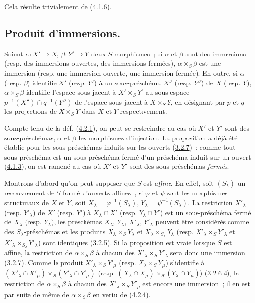 Cela résulte trivialement de (\hyperref[I.4.1.6-fr]{4.1.6}).

\subsection{Produit d'immersions.}
\label{subsection:I.4.3-fr}

\begin{proposition}[4.3.1]
\label{I.4.3.1-fr}
Soient $\alpha:X'\to X$, $\beta:Y'\to Y$ deux $S$-morphismes~; si $\alpha$ et
$\beta$ sont des immersions (resp. des immersions ouvertes, des immersions
fermées), $\alpha\times_S\beta$ est une immersion (resp. une immersion ouverte,
une immersion fermée). En outre, si $\alpha$ (resp. $\beta$) identifie $X'$
(resp. $Y'$) à un sous-préschéma $X''$ (resp. $Y''$) de $X$ (resp. $Y$),
$\alpha\times_S\beta$ identifie l'espace sous-jacent à $X'\times_S Y'$ au
sous-espace $p^{-1}(X'')\cap q^{-1}(Y'')$ de l'espace sous-jacent à
$X\times_S Y$, en désignant par $p$ et $q$ les projections de $X\times_S Y$
dans $X$ et $Y$ respectivement.
\end{proposition}

Compte tenu de la déf. (\hyperref[I.4.2.1-fr]{4.2.1}), on peut se restreindre
au cas où $X'$ et $Y'$ sont des sous-préschémas, $\alpha$ et $\beta$ les
morphismes d'injection. La proposition a déjà été établie pour les
sous-préschémas induits sur les ouverts (\hyperref[I.3.2.7-fr]{3.2.7})~; comme
tout sous-préschéma est un sous-préschéma fermé d'un préschéma induit sur un
ouvert (\hyperref[I.4.1.3-fr]{4.1.3}), on est ramené au cas où $X'$ et $Y'$ sont
des sous-préschémas \emph{fermés}.

Montrons d'abord qu'on peut supposer que $S$ est \emph{affine}. En effet, soit
$(S_\lambda)$ un recouvrement de $S$ formé d'ouverts affines~; si $\varphi$ et
$\psi$ sont les morphismes structuraux de $X$ et $Y$, soit
$X_\lambda=\varphi^{-1}(S_\lambda)$, $Y_\lambda=\psi^{-1}(S_\lambda)$. La
restriction $X'_\lambda$ (resp. $Y'_\lambda$) de $X'$ (resp. $Y'$) à
$X_\lambda\cap X'$ (resp. $Y_\lambda\cap Y'$) est un sous-préschéma fermé de
$X_\lambda$ (resp. $Y_\lambda$), les préschémas $X_\lambda$, $Y_\lambda$,
$X'_\lambda$, $Y'_\lambda$ peuvent être considérés comme des
$S_\lambda$-préschémas et les produits $X_\lambda\times_S Y_\lambda$ et
$X_\lambda\times_{S_\lambda}Y_\lambda$ (resp.
$X'_\lambda\times_S Y'_\lambda$ et
$X'_\lambda\times_{S_\lambda}Y'_\lambda$) sont identiques
(\hyperref[I.3.2.5-fr]{3.2.5}). Si la proposition est vraie lorsque $S$ est
affine, la restriction de $\alpha\times_S\beta$ à chacun des
$X'_\lambda\times_S Y'_\lambda$ sera donc une immersion
(\hyperref[I.3.2.7-fr]{3.2.7}). Comme le produit
$X'_\lambda\times_S Y'_\mu$ (resp. $X_\lambda\times_S Y_\mu$) s'identifie à
$(X'_\lambda\cap X'_\mu)\times_S(Y'_\lambda\cap Y'_\mu)$ (resp.
$(X_\lambda\cap X_\mu)\times_S(Y_\lambda\cap Y_\mu)$)
(\hyperref[I.3.2.6.4-fr]{3.2.6.4}), la restriction de
$\alpha\times_S\beta$
à chacun des $X'_\lambda\times_S Y'_\mu$ est encore une immersion~; il en est
par suite de même de $\alpha\times_S\beta$ en vertu de
(\hyperref[I.4.2.4-fr]{4.2.4}).

